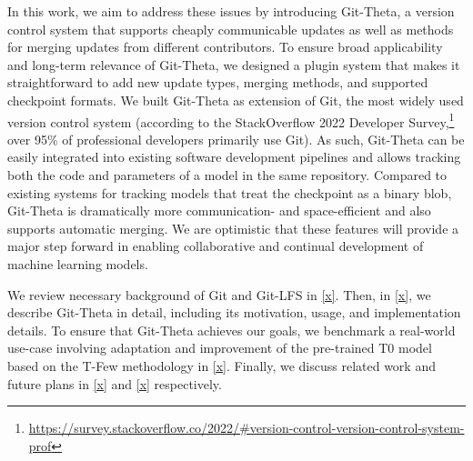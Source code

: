 In this work, we aim to address these issues by introducing Git-Theta, a version control system that supports cheaply communicable updates as well as methods for merging updates from different contributors.
To ensure broad applicability and long-term relevance of Git-Theta, we designed a plugin system that makes it straightforward to add new update types, merging methods, and supported checkpoint formats.
We built Git-Theta as extension of Git, the most widely used version control system (according to the StackOverflow 2022 Developer Survey,\footnote{\url{https://survey.stackoverflow.co/2022/\#version-control-version-control-system-prof}} over 95\% of professional developers primarily use Git).
As such, Git-Theta can be easily integrated into existing software development pipelines and allows tracking both the code and parameters of a model in the same repository.
Compared to existing systems for tracking models that treat the checkpoint as a binary blob, Git-Theta is dramatically more communication- and space-efficient and also supports automatic merging.
We are optimistic that these features will provide a major step forward in enabling collaborative and continual development of machine learning models.

We review necessary background of Git and Git-LFS in \cref{x}.
Then, in \cref{x}, we describe Git-Theta in detail, including its motivation, usage, and implementation details.
To ensure that Git-Theta achieves our goals, we benchmark a real-world use-case involving adaptation and improvement of the pre-trained T0 model \citep{sanh2021multitask} based on the T-Few methodology \citep{liu2022tfew} in \cref{x}.
Finally, we discuss related work and future plans in \cref{x} and \cref{x} respectively.



    
    
    

